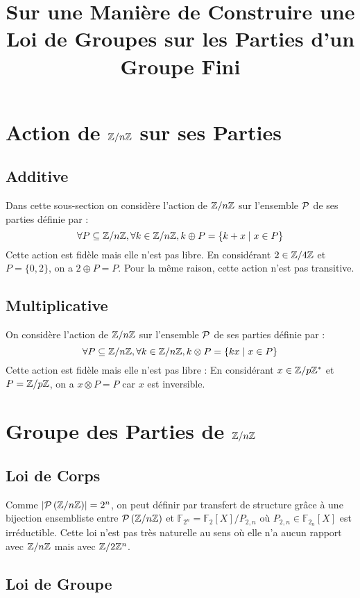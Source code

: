 \documentclass{cours}
\title{Sur une Manière de Construire une Loi de Groupes sur les Parties d'un Groupe Fini}
\begin{document}
\section{Action de $\mathbb{Z}/n\mathbb{Z}$ sur ses Parties}
\subsection{Additive}
Dans cette sous-section on considère l'action de $\mathbb{Z}/n\mathbb{Z}$ sur l'ensemble $\mathcal{P}$ de ses parties définie par : 
\[
	\forall P \subseteq \mathbb{Z}/n\mathbb{Z}, \forall k \in \mathbb{Z}/n\mathbb{Z}, k\oplus P = \left\{k + x \mid x \in P\right\}
\]
Cette action est fidèle mais elle n'est pas libre. En considérant $2 \in \mathbb{Z}/4\mathbb{Z}$ et $P = \{0, 2\}$, on a $2 \oplus P = P$. Pour la même raison, cette action n'est pas transitive.

\subsection{Multiplicative}
On considère l'action de $\mathbb{Z}/n\mathbb{Z}$ sur l'ensemble $\mathcal{P}$ de ses parties définie par : 
\[
	\forall P \subseteq \mathbb{Z}/n\mathbb{Z}, \forall k \in \mathbb{Z}/n\mathbb{Z}, k\otimes P = \left\{k x \mid x \in P\right\}
\]
Cette action est fidèle mais elle n'est pas libre : En considérant $x \in \mathbb{Z}/p\mathbb{Z}^{*}$ et $P = \mathbb{Z}/p\mathbb{Z}$, on a $x \otimes P = P$ car $x$ est inversible. 

\section{Groupe des Parties de $\mathbb{Z}/n\mathbb{Z}$}
\subsection{Loi de Corps}
Comme $\left|\mathcal{P}\left(\mathbb{Z}/n\mathbb{Z}\right)\right| = 2^{n}$, on peut définir par transfert de structure grâce à une bijection ensembliste entre $\mathcal{P}\left(\mathbb{Z}/n\mathbb{Z}\right)$ et $\mathbb{F}_{2^{n}} = \mathbb{F}_{2}[X] / P_{2, n}$ où $P_{2, n} \in \mathbb{F}_{2}_{n}[X]$ est irréductible. 
Cette loi n'est pas très naturelle au sens où elle n'a aucun rapport avec $\mathbb{Z}/n\mathbb{Z}$ mais avec $\mathbb{Z}/2\mathbb{Z}^{n}$. 

\subsection{Loi de Groupe}
\end{document}
